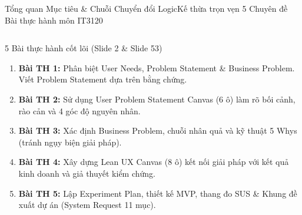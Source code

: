 \documentclass[aspectratio=169, 10pt]{beamer}
\begin{document}
\begin{frame}[t]{Tổng quan Mục tiêu \& Chuỗi Chuyển đổi Logic}{Kế thừa trọn vẹn 5 Chuyên đề Bài thực hành môn IT3120}
  \vspace{-0.1cm}
  \begin{columns}[T]
      \begin{infoCard}{5 Bài thực hành cốt lõi (Slide 2 \& Slide 53)}
        \scriptsize
        \begin{enumerate}\itemsep1.5pt
          \item \textbf{Bài TH 1:} Phân biệt User Needs, Problem Statement \& Business Problem. Viết Problem Statement dựa trên bằng chứng.
          \item \textbf{Bài TH 2:} Sử dụng User Problem Statement Canvas (6 ô) làm rõ bối cảnh, rào cản và 4 góc độ nguyên nhân.
          \item \textbf{Bài TH 3:} Xác định Business Problem, chuỗi nhân quả và kỹ thuật 5 Whys (tránh ngụy biện giải pháp).
          \item \textbf{Bài TH 4:} Xây dựng Lean UX Canvas (8 ô) kết nối giải pháp với kết quả kinh doanh và giả thuyết kiểm chứng.
          \item \textbf{Bài TH 5:} Lập Experiment Plan, thiết kế MVP, thang đo SUS \& Khung đề xuất dự án (System Request 11 mục).
        \end{enumerate}
      \end{infoCard}


\end{columns}
\end{frame}
\end{document}
